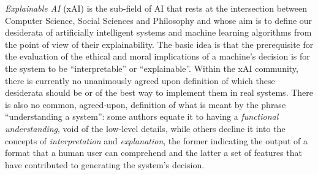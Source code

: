 \textit{Explainable AI }(xAI) is the sub-field of AI that rests at the intersection between Computer Science, Social Sciences and Philosophy and whose aim is to define our desiderata of artificially intelligent systems and machine learning algorithms from the point of view of their explainability.  The basic idea is that the prerequisite for the evaluation of the ethical and moral implications of a machine's decision is for the system to be \enquote{interpretable} or \enquote{explainable}.  
Within the xAI community,  there is currently no unanimously agreed upon definition of which these desiderata should be or of the best way to implement them in real systems.
There is also no common, agreed-upon, definition of what is meant by the phrase \enquote{understanding a system}: some authors equate  it to having a  \textit{functional understanding}, void of the  low-level details, while others decline it into the  concepts of \textit{interpretation} and \textit{explanation}, the former indicating  the output of a format that a human user can comprehend and the latter a set of features that have contributed to generating the system's decision. 

